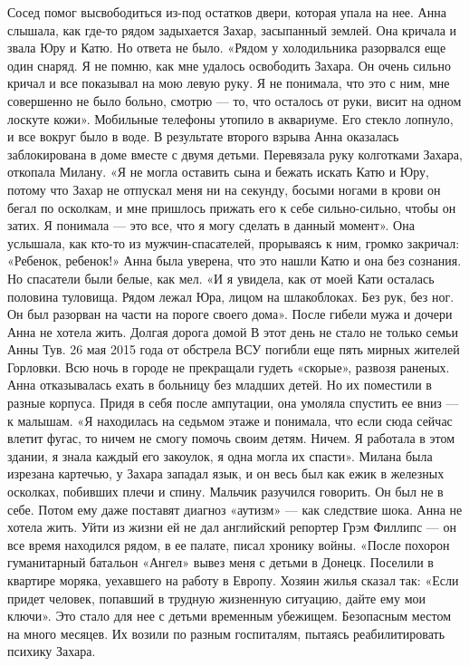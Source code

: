 Сосед помог высвободиться из-под остатков двери, которая упала на нее. Анна слышала, как где-то рядом задыхается Захар, засыпанный землей. Она кричала и звала Юру и Катю. Но ответа не было.
«Рядом у холодильника разорвался еще один снаряд. Я не помню, как мне удалось освободить Захара. Он очень сильно кричал и все показывал на мою левую руку. Я не понимала, что это с ним, мне совершенно не было больно, смотрю — то, что осталось от руки, висит на одном лоскуте кожи».
Мобильные телефоны утопило в аквариуме. Его стекло лопнуло, и все вокруг было в воде. В результате второго взрыва Анна оказалась заблокирована в доме вместе с двумя детьми. Перевязала руку колготками Захара, откопала Милану. «Я не могла оставить сына и бежать искать Катю и Юру, потому что Захар не отпускал меня ни на секунду, босыми ногами в крови он бегал по осколкам, и мне пришлось прижать его к себе сильно-сильно, чтобы он затих. Я понимала — это все, что я могу сделать в данный момент».
Она услышала, как кто-то из мужчин-спасателей, прорываясь к ним, громко закричал: «Ребенок, ребенок!» Анна была уверена, что это нашли Катю и она без сознания. Но спасатели были белые, как мел.
«И я увидела, как от моей Кати осталась половина туловища. Рядом лежал Юра, лицом на шлакоблоках. Без рук, без ног. Он был разорван на части на пороге своего дома».
После гибели мужа и дочери Анна не хотела жить.
Долгая дорога домой
В этот день не стало не только семьи Анны Тув. 26 мая 2015 года от обстрела ВСУ погибли еще пять мирных жителей Горловки. Всю ночь в городе не прекращали гудеть «скорые», развозя раненых.
Анна отказывалась ехать в больницу без младших детей. Но их поместили в разные корпуса. Придя в себя после ампутации, она умоляла спустить ее вниз — к малышам.
«Я находилась на седьмом этаже и понимала, что если сюда сейчас влетит фугас, то ничем не смогу помочь своим детям. Ничем. Я работала в этом здании, я знала каждый его закоулок, я одна могла их спасти».
Милана была изрезана картечью, у Захара западал язык, и он весь был как ежик в железных осколках, побивших плечи и спину. Мальчик разучился говорить. Он был не в себе. Потом ему даже поставят диагноз «аутизм» — как следствие шока.
Анна не хотела жить. Уйти из жизни ей не дал английский репортер Грэм Филлипс — он все время находился рядом, в ее палате, писал хронику войны.
«После похорон гуманитарный батальон «Ангел» вывез меня с детьми в Донецк. Поселили в квартире моряка, уехавшего на работу в Европу. Хозяин жилья сказал так: «Если придет человек, попавший в трудную жизненную ситуацию, дайте ему мои ключи».
Это стало для нее с детьми временным убежищем. Безопасным местом на много месяцев. Их возили по разным госпиталям, пытаясь реабилитировать психику Захара.
